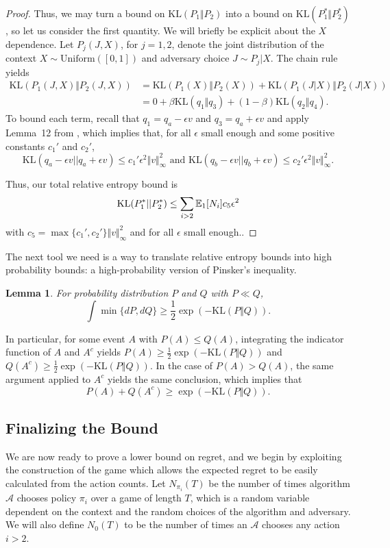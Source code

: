 \documentclass{article}
\newcommand{\KL}{\mathrm{KL}}
\newtheorem{lemma}{Lemma}
\begin{document}
\begin{proof}
Thus, we may turn a bound on $\KL(P_1\Vert P_2)$ into a bound on $\KL(P_1^*\Vert P_2^*)$, so let us consider the first quantity. We will briefly be explicit about the $X$ dependence. Let $P_j(J,X)$, for $j=1,2$, denote the joint distribution of the context $X\sim \mathrm{Uniform}([0,1])$ and adversary choice $J\sim P_j|X$. The chain rule yields
\begin{align*}
    \KL(P_1(J,X)\Vert P_2(J,X))
  &=
    \KL(P_1(X)\Vert P_2(X)) +
    \KL(P_1(J|X)\Vert P_2(J|X))\\
  &=
    0 +
    \beta \KL(q_1\Vert q_3) + (1-\beta) \KL(q_2\Vert q_4).
\end{align*}
To bound each term, recall that $q_1 = q_a - \epsilon v$ and $q_3 = q_a + \epsilon v$ and apply Lemma~12 from \cite{bartok2011minimax}, which implies that, for all $\epsilon$ small enough and some positive constants $c_1'$ and $c_2'$,
\[
  \KL(q_a-\epsilon v || q_a + \epsilon v) \leq c_1' \epsilon^2\Vert v\Vert_\infty^2
  \text{ and }
  \KL(q_b-\epsilon v || q_b + \epsilon v) \leq c_2' \epsilon^2\Vert v\Vert_\infty^2.
\]

Thus, our total relative entropy bound is
\begin{equation}
    \KL(P_1^*||P_2^*)
  \leq
      \sum_{i>2} \ex_1[N_i] c_5\epsilon^2
\end{equation}
with $c_5 = \max\{ c_1', c_2'\}\Vert v \Vert_\infty^2$ and for all $\epsilon$ small enough.. 
\end{proof}
The next tool we need is a way to translate relative entropy bounds into high probability bounds: a high-probability version of Pinsker's inequality.
\begin{lemma}\cite[Lemma 2.6]{Tsybakov-2008-book}
For probability distribution $P$ and $Q$ with $P\ll Q$,
  \[
    \int \min \{ dP, dQ \} \geq \frac12 \exp(- \KL(P \Vert Q)).
    \]
\end{lemma}
In particular, for some event $A$ with $P(A) \leq Q(A)$, integrating the indicator function of $A$ and $A^c$ yields $P(A) \geq \frac12 \exp(- \KL(P \Vert Q))$ and $Q(A^c)\geq \frac12 \exp(- \KL(P \Vert Q))$. In the case of $P(A) > Q(A)$, the same argument applied to $A^c$ yields the same conclusion, which implies that
\begin{equation}\label{eqn:pinsker.high.prob}
  P(A) + Q(A^c)  \geq \exp(- \KL(P \Vert Q)).
\end{equation}


\subsection{Finalizing the Bound}
We are now ready to prove a lower bound on regret, and we begin by exploiting the construction of the game which allows  the expected regret to be easily calculated from the action counts. Let $N_{\pi_i}(T)$ be the number of times algorithm $\mathcal A$ chooses policy $\pi_i$ over a game of length $T$, which is a random variable dependent on the context and the random choices of the algorithm and adversary. We will also define $N_0(T)$ to be the number of times an $\mathcal A$ chooses any action $i>2$.
\end{document}
